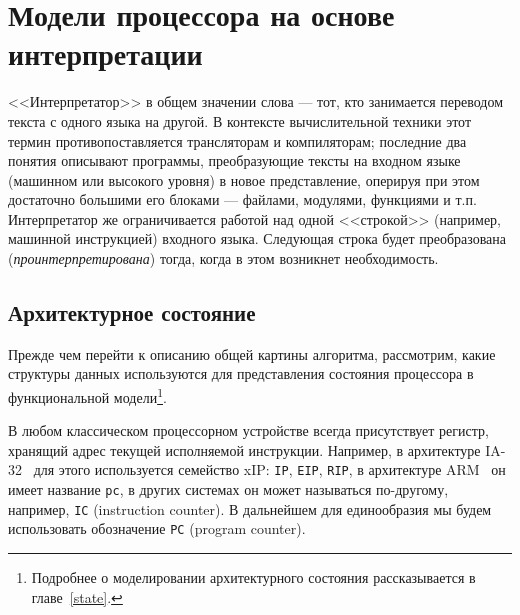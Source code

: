 \chapter{Модели процессора на основе интерпретации}\label{interpretation}


<<Интерпретатор>> в общем значении слова --- тот, кто занимается переводом текста с одного языка на другой. В контексте вычислительной техники этот термин противопоставляется трансляторам и компиляторам; последние два понятия описывают программы, преобразующие тексты на входном языке (машинном или высокого уровня) в новое представление, оперируя при этом достаточно большими его блоками --- файлами, модулями, функциями и т.п. Интерпретатор же ограничивается работой над одной <<строкой>> (например, машинной инструкцией) входного языка. Следующая строка будет преобразована (\emph{проинтерпретирована}) тогда, когда в этом возникнет необходимость.

\section{Архитектурное состояние}

Прежде чем перейти к описанию общей картины алгоритма, рассмотрим, какие структуры данных используются для представления состояния процессора в функциональной модели\footnote{Подробнее о моделировании архитектурного состояния рассказывается в главе~\ref{state}.}.

В любом классическом процессорном устройстве всегда присутствует регистр, хранящий адрес текущей исполняемой инструкции. Например, в архитектуре IA-32~\cite{intelmanual2a} для этого используется семейство xIP: \texttt{IP}, \texttt{EIP}, \texttt{RIP}, в архитектуре ARM~\cite{arm-sdg} он имеет название \texttt{pc}, в других системах он может называться по-другому, например, \texttt{IC} (\abbr instruction counter). В дальнейшем для единообразия мы будем использовать обозначение \texttt{PC} (\abbr program counter).

